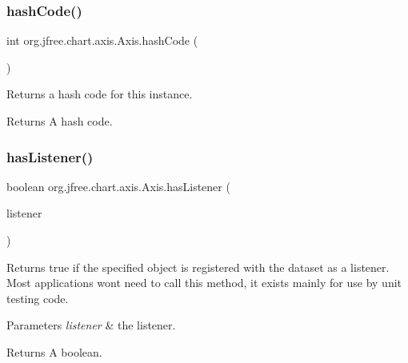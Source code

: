 \subsubsection{\texorpdfstring{hash\+Code()}{hashCode()}}
{\footnotesize\ttfamily int org.\+jfree.\+chart.\+axis.\+Axis.\+hash\+Code (\begin{DoxyParamCaption}{ }\end{DoxyParamCaption})}

Returns a hash code for this instance.

\begin{DoxyReturn}{Returns}
A hash code. 
\end{DoxyReturn}
\mbox{\label{classorg_1_1jfree_1_1chart_1_1axis_1_1_axis_a082480ef7c916bc2b5aeaa9b053ee660}} 
\subsubsection{\texorpdfstring{has\+Listener()}{hasListener()}}
{\footnotesize\ttfamily boolean org.\+jfree.\+chart.\+axis.\+Axis.\+has\+Listener (\begin{DoxyParamCaption}\item[{Event\+Listener}]{listener }\end{DoxyParamCaption})}

Returns {\ttfamily true} if the specified object is registered with the dataset as a listener. Most applications won\textquotesingle{}t need to call this method, it exists mainly for use by unit testing code.


\begin{DoxyParams}{Parameters}
{\em listener} & the listener.\\
\hline
\end{DoxyParams}
\begin{DoxyReturn}{Returns}
A boolean. 
\end{DoxyReturn}
\mbox{\label{classorg_1_1jfree_1_1chart_1_1axis_1_1_axis_a3bf6fd211b960ee08ef22a66016d3786}} 
